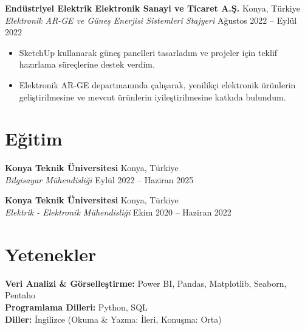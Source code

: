 \documentclass[10pt,a4paper]{extarticle}
\begin{document}
\textbf{Endüstriyel Elektrik Elektronik Sanayi ve Ticaret A.Ş.} \hfill Konya, Türkiye\\
\textit{Elektronik AR-GE ve Güneş Enerjisi Sistemleri Stajyeri} \hfill Ağustos 2022 -- Eylül 2022
\begin{itemize}[leftmargin=*,noitemsep,topsep=0pt]
    \item SketchUp kullanarak güneş panelleri tasarladım ve projeler için teklif hazırlama süreçlerine destek verdim.
    \item Elektronik AR-GE departmanında çalışarak, yenilikçi elektronik ürünlerin geliştirilmesine ve mevcut ürünlerin iyileştirilmesine katkıda bulundum.
\end{itemize}

\section{Eğitim}
\textbf{Konya Teknik Üniversitesi} \hfill Konya, Türkiye\\
\textit{Bilgisayar Mühendisliği} \hfill Eylül 2022 -- Haziran 2025

\textbf{Konya Teknik Üniversitesi} \hfill Konya, Türkiye\\
\textit{Elektrik - Elektronik Mühendisliği} \hfill Ekim 2020 -- Haziran 2022

\section{Yetenekler}
\textbf{Veri Analizi \& Görselleştirme:} Power BI, Pandas, Matplotlib, Seaborn, Pentaho\\
\textbf{Programlama Dilleri:} Python, SQL\\
\textbf{Diller:} İngilizce (Okuma \& Yazma: İleri, Konuşma: Orta)
\end{document}
